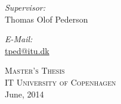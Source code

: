\begin{titlepage}
\begin{center}
\begin{minipage}{0.4\textwidth}
\begin{flushleft} \large
\emph{Supervisor:}\\
Thomas Olof Pederson\\
\end{flushleft}
\end{minipage}
\begin{minipage}{0.4\textwidth}
\begin{flushright} \large
\emph{E-Mail:} \\
\href{mailto:tped@itu.dk}{tped@itu.dk}\\
\end{flushright}
\end{minipage}

\vfill

\textsc{\LARGE Master's Thesis}\\[0.2cm]
\textsc{\LARGE IT University of Copenhagen}\\[0.2cm]
{\large June, 2014}

\end{center}

\end{titlepage}
\restoregeometry










